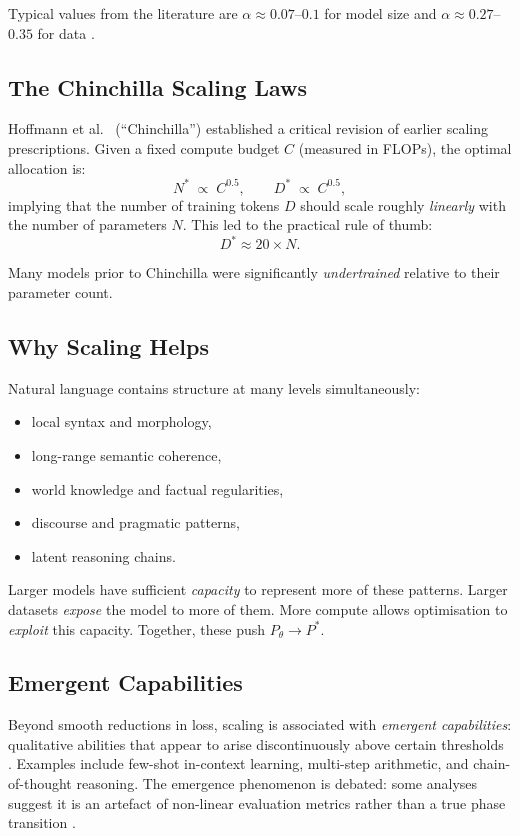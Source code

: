 \documentclass[11pt,a4paper]{article}
\theoremstyle{definition}
\theoremstyle{plain}
\begin{document}
\noindent
Typical values from the literature are $\alpha \approx 0.07$--$0.1$ for model
size and $\alpha \approx 0.27$--$0.35$ for data \cite{kaplan2020scaling}.

\subsection{The Chinchilla Scaling Laws}

Hoffmann et al.\ \cite{hoffmann2022training} (``Chinchilla'') established a
critical revision of earlier scaling prescriptions.
Given a fixed compute budget $C$ (measured in FLOPs), the optimal allocation is:
\[
  N^* \;\propto\; C^{0.5}, \qquad D^* \;\propto\; C^{0.5},
\]
implying that the number of training tokens $D$ should scale roughly \emph{linearly}
with the number of parameters $N$.
This led to the practical rule of thumb:
\[
  D^* \approx 20 \times N.
\]

Many models prior to Chinchilla were significantly \emph{undertrained} relative
to their parameter count.

\subsection{Why Scaling Helps}

Natural language contains structure at many levels simultaneously:
\begin{itemize}[leftmargin=2em, itemsep=2pt]
  \item local syntax and morphology,
  \item long-range semantic coherence,
  \item world knowledge and factual regularities,
  \item discourse and pragmatic patterns,
  \item latent reasoning chains.
\end{itemize}

Larger models have sufficient \emph{capacity} to represent more of these patterns.
Larger datasets \emph{expose} the model to more of them.
More compute allows optimisation to \emph{exploit} this capacity.
Together, these push $P_\theta \to P^*$.

\subsection{Emergent Capabilities}

Beyond smooth reductions in loss, scaling is associated with \emph{emergent capabilities}:
qualitative abilities that appear to arise discontinuously above certain thresholds
\cite{wei2022emergent}.
Examples include few-shot in-context learning, multi-step arithmetic, and
chain-of-thought reasoning.
The emergence phenomenon is debated: some analyses suggest it is an artefact of
non-linear evaluation metrics rather than a true phase transition
\cite{schaeffer2023emergent}.
\end{document}
